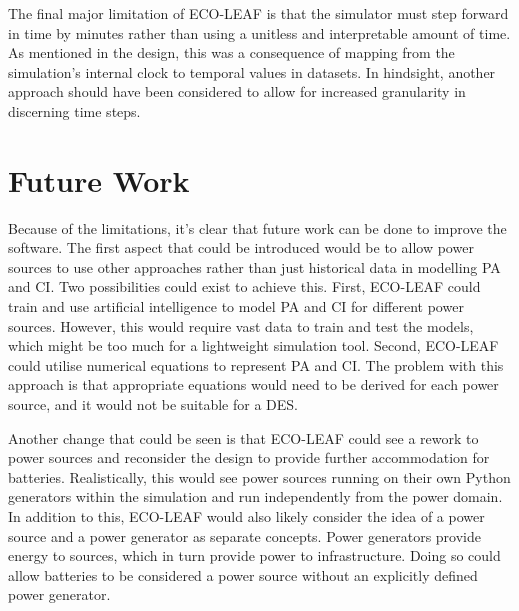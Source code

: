 \documentclass{l4proj}
\begin{document}
The final major limitation of ECO-LEAF is that the simulator must step forward in time by minutes rather than using a unitless and interpretable amount of time.
As mentioned in the design, this was a consequence of mapping from the simulation's internal clock to temporal values in datasets.
In hindsight, another approach should have been considered to allow for increased granularity in discerning time steps.
\section{Future Work}\label{conc:sec:Future Work}
Because of the limitations, it's clear that future work can be done to improve the software.
The first aspect that could be introduced would be to allow power sources to use other approaches rather than just historical data in modelling PA and CI.
Two possibilities could exist to achieve this.
First, ECO-LEAF could train and use artificial intelligence to model PA and CI for different power sources. However, this would require vast data to train and test the models, which might be too much for a lightweight simulation tool.
Second, ECO-LEAF could utilise numerical equations to represent PA and CI. The problem with this approach is that appropriate equations would need to be derived for each power source, and it would not be suitable for a DES.

Another change that could be seen is that ECO-LEAF could see a rework to power sources and reconsider the design to provide further accommodation for batteries.
Realistically, this would see power sources running on their own Python generators within the simulation and run independently from the power domain.
In addition to this, ECO-LEAF would also likely consider the idea of a power source and a power generator as separate concepts. Power generators provide energy to sources, which in turn provide power to infrastructure.
Doing so could allow batteries to be considered a power source without an explicitly defined power generator.
\end{document}

